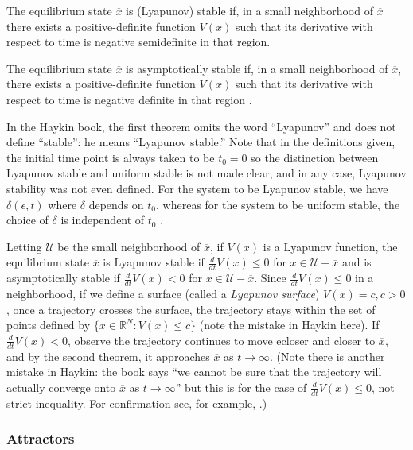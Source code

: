 \begin{theorem}
The equilibrium state $\overline{x}$ is (Lyapunov) stable if, in a small neighborhood of $\overline{x}$ there exists a positive-definite function $V(x)$ such that its derivative with respect to time is negative semidefinite in that region.
\end{theorem}

\begin{theorem}
The equilibrium state $\overline{x}$ is asymptotically stable if, in a small neighborhood of $\overline{x}$, there exists a positive-definite function $V(x)$ such that its derivative with respect to time is negative definite in that region \cite[p. 682]{Haykin:2009:NNC:1213811}.
\end{theorem}

In the Haykin book, the first theorem omits the word ``Lyapunov'' and does not define ``stable'': he means ``Lyapunov stable.'' Note that in the definitions given, the initial time point is always taken to be $t_0 = 0$ so the distinction between Lyapunov stable and uniform stable is not made clear, and in any case, Lyapunov stability was not even defined. For the system to be Lyapunov stable, we have $\delta(\epsilon, t)$ where $\delta$ depends on $t_0$, whereas for the system to be uniform stable, the choice of $\delta$ is independent of $t_0$ \cite{byao}.

Letting $\mathcal{U}$ be the small neighborhood of $\overline{x}$, if $V(x)$ is a Lyapunov function, the equilibrium state $\overline{x}$ is Lyapunov stable if $\frac{d}{dt} V(x) \leq 0$ for $x \in \mathcal{U} - \overline{x}$ and is asymptotically stable if $\frac{d}{dt}V(x) < 0$ for $x \in \mathcal{U} - \overline{x}$. Since $\frac{d}{dt} V(x) \leq 0$ in a neighborhood, if we define a surface (called a \emph{Lyapunov surface}) $V(x) = c, c > 0$, once a trajectory crosses the surface, the trajectory stays within the set of points defined by $\{x \in \mathbb{R}^N : V(x) \leq c\}$ (note the mistake in Haykin here). If $\frac{d}{dt}V(x) < 0$, observe the trajectory continues to move ecloser and closer to $\overline{x}$, and by the second theorem, it approaches $\overline{x}$ as $t \to \infty$. (Note there is another mistake in Haykin: the book says ``we cannot be sure that the trajectory will actually converge onto $\overline{x}$ as $t \to \infty$'' but this is for the case of $\frac{d}{dt} V(x) \leq 0$, not strict inequality. For confirmation see, for example, \cite[p. 18-19]{christofides2005control}.)

\subsubsection{Attractors}

